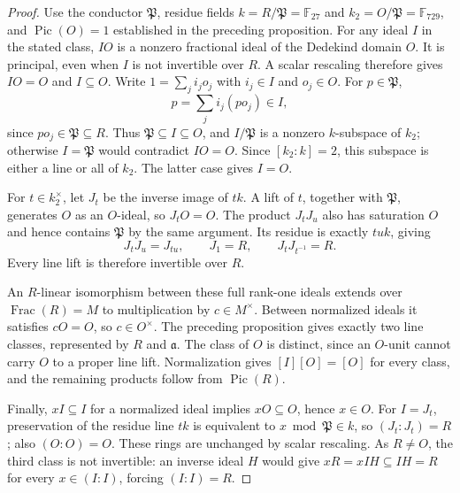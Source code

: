 \begin{proof}
Use the conductor $\mathfrak P$, residue fields
$k=R/\mathfrak P=\mathbb F_{27}$ and
$k_2=O/\mathfrak P=\mathbb F_{729}$, and
$\operatorname{Pic}(O)=1$ established in the preceding proposition.
For any ideal $I$ in the stated class, $IO$ is a nonzero fractional
ideal of the Dedekind domain $O$. It is principal, even when $I$
is not invertible over $R$. A scalar rescaling therefore gives
$IO=O$ and $I\subseteq O$. Write $1=\sum_j i_j o_j$ with
$i_j\in I$ and $o_j\in O$. For $p\in\mathfrak P$,
\[
 p=\sum_j i_j(po_j)\in I,
\]
since $po_j\in\mathfrak P\subseteq R$. Thus
$\mathfrak P\subseteq I\subseteq O$, and $I/\mathfrak P$
is a nonzero $k$-subspace of $k_2$; otherwise $I=\mathfrak P$
would contradict $IO=O$. Since $[k_2:k]=2$, this subspace is
either a line or all of $k_2$. The latter case gives $I=O$.

For $t\in k_2^\times$, let $J_t$ be the inverse image of $tk$.
A lift of $t$, together with $\mathfrak P$, generates $O$ as an
$O$-ideal, so $J_tO=O$. The product $J_tJ_u$ also has saturation
$O$ and hence contains $\mathfrak P$ by the same argument.
Its residue is exactly $tuk$, giving
\[
 J_tJ_u=J_{tu},\qquad J_1=R,\qquad J_tJ_{t^{-1}}=R.
\]
Every line lift is therefore invertible over $R$.

An $R$-linear isomorphism between these full rank-one ideals
extends over $\operatorname{Frac}(R)=M$ to multiplication by
$c\in M^\times$. Between normalized ideals it satisfies $cO=O$,
so $c\in O^\times$. The preceding proposition gives exactly two
line classes, represented by $R$ and $\mathfrak a$. The class of
$O$ is distinct, since an $O$-unit cannot carry $O$ to a proper
line lift. Normalization gives $[I][O]=[O]$ for every class,
and the remaining products follow from $\operatorname{Pic}(R)$.

Finally, $xI\subseteq I$ for a normalized ideal implies
$xO\subseteq O$, hence $x\in O$. For $I=J_t$, preservation of
the residue line $tk$ is equivalent to $x\bmod\mathfrak P\in k$,
so $(J_t:J_t)=R$; also $(O:O)=O$. These rings are unchanged by
scalar rescaling. As $R\ne O$, the third class is not invertible:
an inverse ideal $H$ would give $xR=xIH\subseteq IH=R$ for
every $x\in(I:I)$, forcing $(I:I)=R$.
\end{proof}


